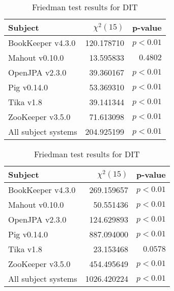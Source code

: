 \begin{table}
\begin{spacing}{1.2}
\centering
\parbox{.45\linewidth}{
\centering
\caption{Friedman test results for FLT}
\label{table:combo-friedman-flt}
\begin{tabular}{lrr}
\toprule
                      Subject &  $\chi^2(15)$ &  p-value \\
\midrule
            BookKeeper v4.3.0 &    120.178710 & $p<0.01$ \\
               Mahout v0.10.0 &     13.595833 & $0.4802$ \\
               OpenJPA v2.3.0 &     39.360167 & $p<0.01$ \\
                  Pig v0.14.0 &     53.369310 & $p<0.01$ \\
                    Tika v1.8 &     39.141344 & $p<0.01$ \\
             ZooKeeper v3.5.0 &     71.613098 & $p<0.01$ \\
 \midrule
All subject systems &    204.925199 & $p<0.01$ \\
\bottomrule
\end{tabular}
}
\hfill
\parbox{.45\linewidth}{
\centering
\caption{Friedman test results for DIT}
\label{table:combo-friedman-dit}
\begin{tabular}{lrr}
\toprule
                      Subject &  $\chi^2(15)$ &  p-value \\
\midrule
            BookKeeper v4.3.0 &    269.159657 & $p<0.01$ \\
               Mahout v0.10.0 &     50.551436 & $p<0.01$ \\
               OpenJPA v2.3.0 &    124.629893 & $p<0.01$ \\
                  Pig v0.14.0 &    887.094000 & $p<0.01$ \\
                    Tika v1.8 &     23.153468 & $0.0578$ \\
             ZooKeeper v3.5.0 &    454.495649 & $p<0.01$ \\
 \midrule
All subject systems &   1026.420224 & $p<0.01$ \\
\bottomrule
\end{tabular}
}
\end{spacing}
\end{table}

